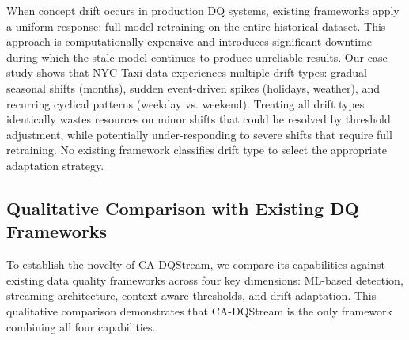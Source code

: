 When concept drift occurs in production DQ systems, existing frameworks apply a uniform response: full model retraining on the entire historical dataset. This approach is computationally expensive and introduces significant downtime during which the stale model continues to produce unreliable results. Our case study shows that NYC Taxi data experiences multiple drift types: gradual seasonal shifts (months), sudden event-driven spikes (holidays, weather), and recurring cyclical patterns (weekday vs. weekend). Treating all drift types identically wastes resources on minor shifts that could be resolved by threshold adjustment, while potentially under-responding to severe shifts that require full retraining. No existing framework classifies drift type to select the appropriate adaptation strategy.

\subsection{Qualitative Comparison with Existing DQ Frameworks}

To establish the novelty of CA-DQStream, we compare its capabilities against existing data quality frameworks across four key dimensions: ML-based detection, streaming architecture, context-aware thresholds, and drift adaptation. This qualitative comparison demonstrates that CA-DQStream is the only framework combining all four capabilities.

